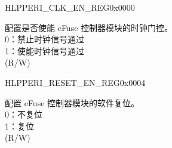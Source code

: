 \begin{register}{H}{LPPERI\_CLK\_EN\_REG}{0x0000}\label{regdesc:LPPERICLKENREG}
%
%
%
\regnewline%
\begin{regdesc}\begin{reglist}
\label{fielddesc:LPPERIEFUSECKEN}\item [LPPERI\_EFUSE\_CK\_EN] 配置是否使能 eFuse 控制器模块的时钟门控。 \\
0：禁止时钟信号通过\\
1：使能时钟信号通过\\(R/W)
\end{reglist}\end{regdesc}
\end{register}


\begin{register}{H}{LPPERI\_RESET\_EN\_REG}{0x0004}\label{regdesc:LPPERIRESETENREG}
%
%
%
\regnewline%
\begin{regdesc}\begin{reglist}
\label{fielddesc:LPPERIEFUSERESETEN}\item [LPPERI\_EFUSE\_RESET\_EN] 配置 eFuse 控制器模块的软件复位。\\
0：不复位\\
1：复位\\(R/W)
\end{reglist}\end{regdesc}
\end{register}
